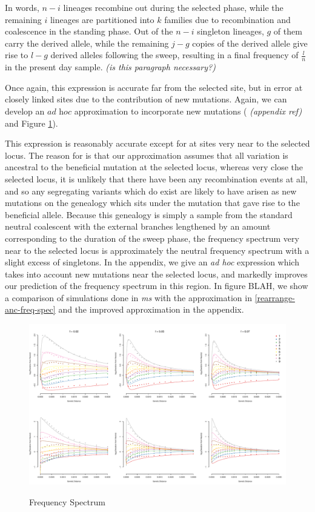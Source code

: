 \documentclass[a4paper,10pt]{article}
\newcommand{\jb}[1]{{\it\color{blue} (#1)} }
\begin{document}
In words, $n-i$ lineages recombine out during the selected phase, while the remaining $i$ lineages are partitioned into $k$ families due to recombination and coalescence in the standing phase. Out of the $n-i$ singleton lineages, $g$ of them carry the derived allele, while the remaining $j-g$ copies of the derived allele give rise to $l-g$ derived alleles following the sweep, resulting in a final frequency of  $\frac{l}{n}$ in the present day sample. \jb{is this paragraph necessary?}

Once again, this expression is accurate far from the selected site, but in error at closely linked sites due to the contribution of new mutations. Again, we can develop an $\textit{ad hoc}$ approximation to incorporate new mutations (\jb{appendix ref} and Figure \ref{freq_spec}).

This expression is reasonably accurate except for at sites very near to the selected locus. The reason for is that our approximation assumes that all variation is ancestral to the beneficial mutation at the selected locus, whereas very close the selected locus, it is unlikely that there have been any recombination events at all, and so any segregating variants which do exist are likely to have arisen as new mutations on the genealogy which sits under the mutation that gave rise to the beneficial allele. Because this genealogy is simply a sample from the standard neutral coalescent with the external branches lengthened by an amount corresponding to the duration of the sweep phase, the frequency spectrum very near to the selected locus is approximately the neutral frequency spectrum with a slight excess of singletons. In the appendix, we give an \textit{ad hoc} expression which takes into account new mutations near the selected locus, and markedly improves our prediction of the frequency spectrum in this region. In figure BLAH, we show a comparison of simulations done in \textit{ms} with the approximation in \eqref{rearrange-anc-freq-spec} and the improved approximation in the appendix.

\begin{figure}
	\includegraphics[width = \textwidth]{../Paper_Figures/freq_spec_nosweep_logfold_sixpanel_020507.pdf} \label{freq_spec}
	\caption{Frequency Spectrum}
\end{figure}
\end{document}
